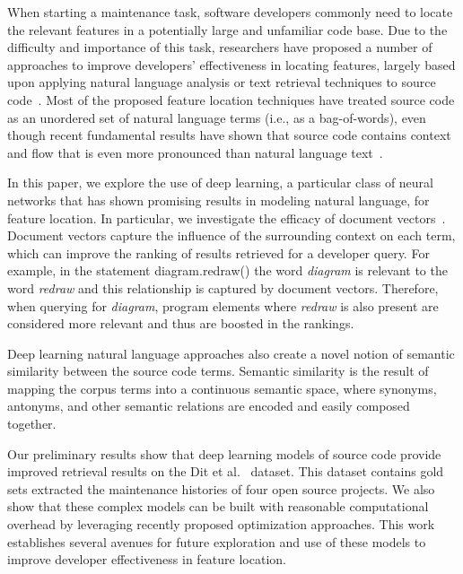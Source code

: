 
% 
%
When starting a maintenance task, software developers commonly need to
locate the relevant features in a potentially large and unfamiliar
code base. Due to the difficulty and importance of this task,
researchers have proposed a number of approaches to improve
developers' effectiveness in locating features, largely based upon
applying natural language analysis or text retrieval techniques to source
code~\cite{dit_feature_2013}. Most of the proposed feature location
techniques have treated source code as an unordered set of natural
language terms (i.e., as a bag-of-words), even though recent fundamental
results have shown that source code contains context and flow that is
even more pronounced than natural language
text~\cite{hindle_naturalness_2012}.


%
%
In this paper, we explore the use of deep learning, a particular class of neural networks that has shown promising
results in modeling natural language, for feature location. In
particular, we investigate the efficacy of document
vectors~\cite{le_distributed_2014}. Document vectors capture the
influence of the surrounding context on each term, which can improve the ranking
of results retrieved for a developer query. For example, in the
statement {\sf diagram.redraw()} the word {\em diagram} is relevant to the word
{\em redraw} and this relationship is captured by document vectors. Therefore, when querying for {\em diagram}, program elements
where {\em redraw} is also present are considered more relevant and thus are boosted in the rankings.

Deep learning natural language approaches also create a novel notion
of semantic similarity between the source code terms. Semantic
similarity is the result of mapping the corpus terms into a continuous
semantic space, where synonyms, antonyms, and other semantic relations
are encoded and easily composed together.


%
%

Our preliminary results show that deep learning models of source code provide
improved retrieval results on the Dit et al.~\cite{Dit-etal_2013} dataset.
This dataset contains gold sets extracted the maintenance histories of four open
source projects. We also show that these complex models can be built with
reasonable computational overhead by leveraging recently proposed optimization
approaches. This work establishes several avenues for future exploration and use
of these models to improve developer effectiveness in feature location.



